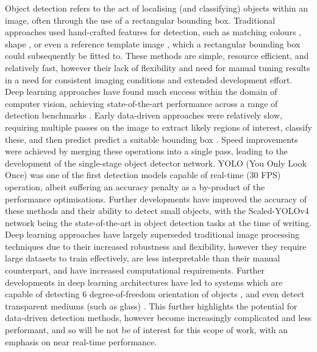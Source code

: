 \documentclass[10pt]{article}
\begin{document}
Object detection refers to the act of localising (and classifying) objects within an image, often through the use of a rectangular bounding box. Traditional approaches used hand-crafted features for detection, such as matching colours \cite{hamuda2017automatic}, shape \cite{leavers1992shape}, or even a reference template image \cite{briechle2001template}, which a rectangular bounding box could subsequently be fitted to. These methods are simple, resource efficient, and relatively fast, however their lack of flexibility and need for manual tuning results in a need for consistent imaging conditions and extended development effort. Deep learning approaches have found much success within the domain of computer vision, achieving state-of-the-art performance across a range of detection benchmarks \cite{o2019deep}. Early data-driven approaches were relatively slow, requiring multiple passes on the image to extract likely regions of interest, classify these, and then predict predict a suitable bounding box \cite{ren2015faster}. Speed improvements were achieved by merging these operations into a single pass, leading to the development of the single-stage object detector network. YOLO (You Only Look Once) \cite{redmon2016you} was one of the first detection models capable of real-time (30 FPS) operation, albeit suffering an accuracy penalty as a by-product of the performance optimisations. Further developments have improved the accuracy of these methods and their ability to detect small objects, with the Scaled-YOLOv4 network \cite{wang2021scaledyolov4} being the state-of-the-art in object detection tasks at the time of writing. Deep learning approaches have largely superseded traditional image processing techniques due to their increased robustness and flexibility, however they require large datasets to train effectively, are less interpretable than their manual counterpart, and have increased computational requirements. Further developments in deep learning architectures have led to systems which are capable of detecting 6 degree-of-freedom orientation of objects \cite{pavlakos20176}, and even detect transparent mediums (such as glass) \cite{lai2015transparent}\cite{khaing2018transparent}. This further highlights the potential for data-driven detection methods, however become increasingly complicated and less performant, and so will be not be of interest for this scope of work, with an emphasis on near real-time performance.
\end{document}

